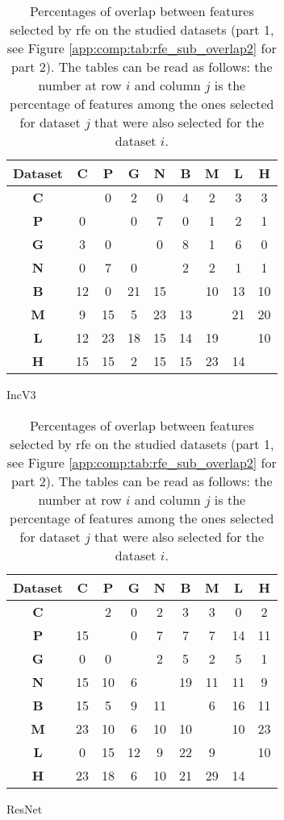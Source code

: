 \begin{table}
  \begin{subtable}[h]{0.45\textwidth}
    \centering
    \begin{tabular}{|c|cccccccc|} 
    \hline
    Dataset & \textbf{C} & \textbf{P} & \textbf{G} & \textbf{N} & \textbf{B} & \textbf{M} & \textbf{L} & \textbf{H}\\
    \hline
    \textbf{C} &   & 0 & 2 & 0 & 4 & 2 & 3 & 3 \\
    \textbf{P} & 0 &   & 0 & 7 & 0 & 1 & 2 & 1 \\
    \textbf{G} & 3 & 0 &   & 0 & 8 & 1 & 6 & 0 \\
    \textbf{N} & 0 & 7 & 0 &   & 2 & 2 & 1 & 1 \\
    \textbf{B} & 12 & 0 & 21 & 15 &   & 10 & 13 & 10 \\
    \textbf{M} & 9 & 15 & 5 & 23 & 13 &   & 21 & 20 \\
    \textbf{L} & 12 & 23 & 18 & 15 & 14 & 19 &   & 10 \\
    \textbf{H} & 15 & 15 & 2 & 15 & 15 & 23 & 14 & \\
    \hline
    \end{tabular}
    \caption{IncV3}
  \end{subtable}

  \begin{subtable}[h]{0.45\textwidth}
    \centering
    \begin{tabular}{|c|cccccccc|} 
    \hline
    Dataset & \textbf{C} & \textbf{P} & \textbf{G} & \textbf{N} & \textbf{B} & \textbf{M} & \textbf{L} & \textbf{H}\\
    \hline
    \textbf{C} &   & 2 & 0 & 2 & 3 & 3 & 0 & 2 \\
    \textbf{P} & 15 &   & 0 & 7 & 7 & 7 & 14 & 11 \\
    \textbf{G} & 0 & 0 &   & 2 & 5 & 2 & 5 & 1 \\
    \textbf{N} & 15 & 10 & 6 &   & 19 & 11 & 11 & 9 \\
    \textbf{B} & 15 & 5 & 9 & 11 &   & 6 & 16 & 11 \\
    \textbf{M} & 23 & 10 & 6 & 10 & 10 &   & 10 & 23 \\
    \textbf{L} & 0 & 15 & 12 & 9 & 22 & 9 &   & 10 \\
    \textbf{H} & 23 & 18 & 6 & 10 & 21 & 29 & 14 & \\
    \hline
    \end{tabular}
    \caption{ResNet}
  \end{subtable} \\

  \caption{Percentages of overlap between features selected by \acrshort{rfe} on the studied datasets (part 1, see Figure \ref{app:comp:tab:rfe_sub_overlap2} for part 2). The tables can be read as follows: the number at row $i$ and column $j$ is the percentage of features among the ones selected for dataset $j$ that were also selected for the dataset $i$.}
  \label{app:comp:tab:rfe_sub_overlap}
\end{table}

